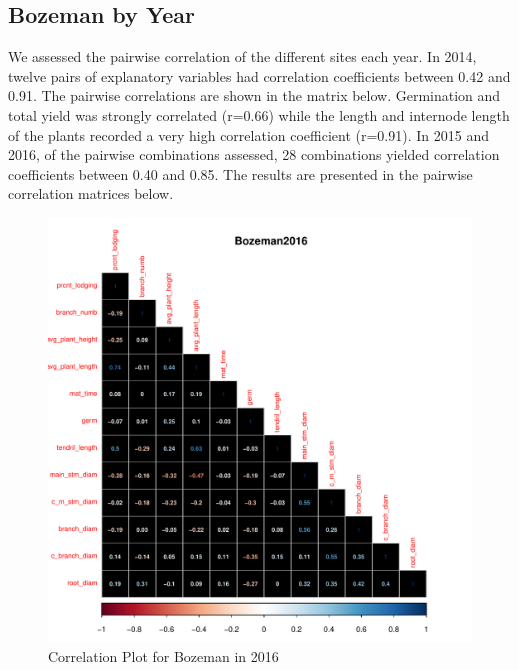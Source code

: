 \documentclass[11pt]{article}\usepackage[]{graphicx}\usepackage[]{color}
\makeatletter
\def\maxwidth{ %
  \ifdim\Gin@nat@width>\linewidth
    \linewidth
  \else
    \Gin@nat@width
  \fi
}
\newenvironment{knitrout}{}{} %
\makeatother
\begin{document}
\subsection{Bozeman by Year}
We assessed the pairwise correlation of the different sites each year. In 2014, twelve pairs of explanatory variables had correlation coefficients between 0.42 and 0.91. The pairwise correlations are shown in the matrix below. Germination and total yield was strongly correlated (r=0.66) while the length and internode length of the plants recorded a very high correlation coefficient (r=0.91). In 2015 and 2016, of the pairwise combinations assessed, 28 combinations yielded correlation coefficients between 0.40 and 0.85. The results are presented in the pairwise correlation matrices below.

\begin{knitrout}\footnotesize
{}\color{fgcolor}\begin{figure}[H]

{\centering \includegraphics[width=\maxwidth]{figure/bz-1} 

}

\caption[Correlation Plot for Bozeman in 2016]{Correlation Plot for Bozeman in 2016}\label{fig:bz}
\end{figure}


\end{knitrout}
\end{document}
